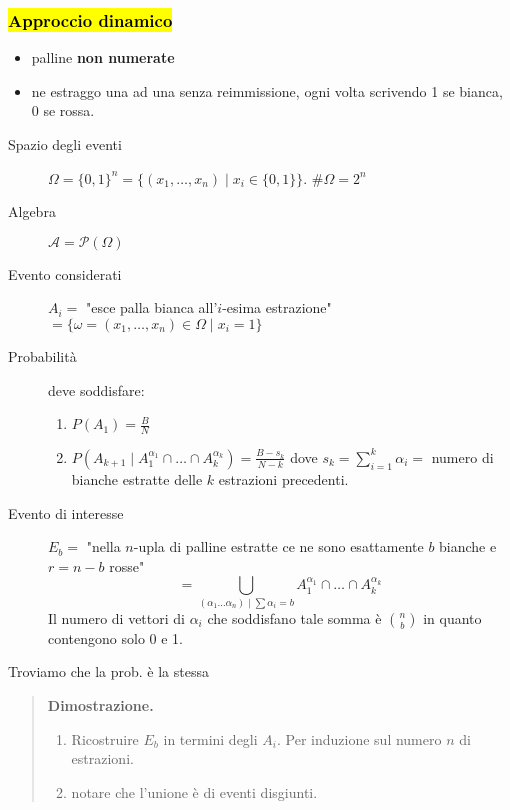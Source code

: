 \documentclass[a4paper,10pt]{article}
\theoremstyle{remark}
\theoremstyle{definition}
\newenvironment{dimo}{\begin{quote}\textbf{Dimostrazione.}}{\end{quote}} %
\begin{document}
\subsubsection*{\hl{Approccio dinamico}} 
\begin{itemize}
    \item palline \textbf{non numerate}
    \item ne estraggo una ad una senza reimmissione, ogni volta scrivendo 1 se bianca, 0 se rossa.
\end{itemize}
\begin{description}
    \item[Spazio degli eventi] $\Omega=\{0,1\}^n=\{(x_1,\dots,x_n) \mid x_i\in \{0,1\}\}$. $\#\Omega=2^n$
    \item[Algebra] $\mathcal{A}=\mathscr{P}(\Omega)$
    \item[Evento considerati] $A_i=$ "esce palla bianca all'$i$-esima estrazione" $=\{\omega = (x_1,\dots,x_n)\in \Omega \mid x_i=1\}$
    \item[Probabilità] deve soddisfare:
    \begin{enumerate}
        \item $P(A_1)=\frac{B}{N}$
        \item $P(A_{k+1} \mid A_1^{\alpha_1}\cap\dots\cap A_k^{\alpha_k})= \frac{B-s_k}{N-k} $ dove $s_k=\sum_{i=1}^k\alpha_i=$ numero di bianche estratte delle $k$ estrazioni precedenti.
    \end{enumerate}
    \item[Evento di interesse] $E_b =$ "nella $n$-upla di palline estratte ce ne sono esattamente $b$ bianche e $r=n-b$ rosse" 
    $$=\bigcup_{(\alpha_1 \dots \alpha_n)\mid\sum\alpha_i=b}A_1^{\alpha_1}\cap\dots\cap A_k^{\alpha_k}$$
    Il numero di vettori di $\alpha_i$ che soddisfano tale somma è $\binom{n}{b}$ in quanto contengono solo 0 e 1.
\end{description}
Troviamo che la prob. è la stessa
\begin{dimo}
    \begin{enumerate}
        \item Ricostruire $E_b$ in termini degli $A_i$. Per induzione sul numero $n$ di estrazioni.
        \item notare che l'unione è di eventi disgiunti.
    \end{enumerate}
\end{dimo}
\end{document}
